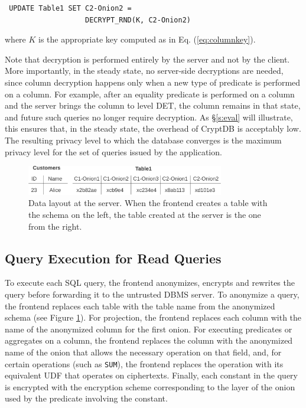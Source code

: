 \begin{verbatim}
 UPDATE Table1 SET C2-Onion2 =
                   DECRYPT_RND(K, C2-Onion2)
\end{verbatim}
 
\noindent where $K$ is the appropriate key computed as in Eq.
(\ref{eq:columnkey}).

Note that decryption is performed entirely by the server and not by the client.
More importantly, in the steady state, no server-side decryptions are needed,
since column decryption happens only when a new type of predicate is performed
on a column.  For example, after an equality predicate is performed on a column
and the server brings the column to level DET, the column remains in that state,
and future such queries no longer require decryption.  As \S\ref{s:eval}
will illustrate, this ensures that, in the steady state, the overhead of CryptDB
is acceptably low.  The resulting privacy level to which the database converges
is the maximum privacy level for the set of queries issued by the application.



\begin{figure}[t!] 
\centering
\includegraphics[width=3.4in]{fig/schema.pdf}
\caption{Data layout at the server. When the frontend creates a table
with the schema on the left, the table created at the server is the one from
the right.}
\label{fig:schema}
\end{figure}


\subsection{Query Execution for Read Queries}

To execute each SQL query, the frontend anonymizes, encrypts and rewrites
the query before forwarding it to the untrusted DBMS server.  To anonymize
a query, the frontend replaces each table with the table name from the
anonymized schema (see Figure \ref{fig:schema}).  For projection, the
frontend replaces each column with the name of the anonymized column for
the first onion.  For executing predicates or aggregates on a column, the
frontend replaces the column with the anonymized name of the onion that
allows the necessary operation on that field, and, for certain operations
(such as {\tt SUM}), the frontend replaces the operation with its equivalent
UDF that operates on ciphertexts.
Finally, each constant in the query is encrypted with the encryption scheme
corresponding to the layer of the onion used by the predicate involving the
constant.

